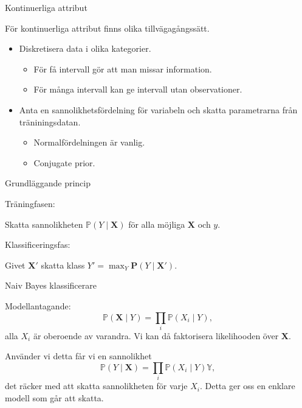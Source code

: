 \documentclass[10pt,english]{beamer}
\begin{document}
\begin{frame}{Kontinuerliga attribut}

    För kontinuerliga attribut finns olika tillvägagångssätt.

    \begin{itemize}
        \item Diskretisera data i olika kategorier.
        \begin{itemize}
            \item För få intervall gör att man missar information.
            \item För många intervall kan ge intervall utan observationer.
        \end{itemize}
        \item Anta en sannolikhetsfördelning för variabeln och skatta parametrarna från träniningsdatan.
        \begin{itemize}
            \item Normalfördelningen är vanlig.
            \item Conjugate prior.
        \end{itemize}
    \end{itemize}
    
\end{frame}

\begin{frame}{Grundläggande princip}

    Träningfasen:

    Skatta sannolikheten $\mathbb{P}(Y \mid \mathbf{X})$ för alla möjliga $\mathbf{X}$ och $y$.

    Klassificeringsfas:

    Givet $\mathbf{X}'$ skatta klass $Y' = \max_Y \mathbf{P}(Y \mid \mathbf{X}')$.
    
\end{frame}

\begin{frame}{Naiv Bayes klassificerare}

    Modellantagande:
    \begin{equation*}
        \mathbb{P}(\mathbf{X} \mid Y) = \prod_i \mathbb{P}(X_i \mid Y),
    \end{equation*}
    alla $X_i$ är oberoende av varandra. Vi kan då faktorisera likelihooden över $\mathbf{X}$.

    Använder vi detta får vi en sannolikhet
    \begin{equation*}
        \mathbb{P}(Y \mid \mathbf{X}) = \prod_i \mathbb{P}(X_i \mid Y) \mathbb{Y},
    \end{equation*}
    det räcker med att skatta sannolikheten för varje $X_i$. Detta ger oss en enklare modell som går att skatta.
    
\end{frame}
\end{document}
